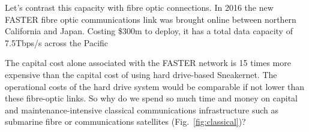 \documentclass[twocolumn, aps, rmp, amsmath, amssymb, nofootinbib, superscriptaddress, longbibliography, floatfix, table-of-contents, eqsecnum]{revtex4-2}
\begin{document}
Let's contrast this capacity with fibre optic connections. In 2016 the new FASTER fibre optic communications link was brought online between northern California and Japan. Costing \$300m to deploy, it has a total data capacity of 7.5Tbps/s across the Pacific %

The capital cost alone associated with the FASTER network is 15 times more expensive than the capital cost of using hard drive-based Sneakernet. The operational costs of the hard drive system would be comparable if not lower than these fibre-optic links. So why do we spend so much time and money on capital and maintenance-intensive classical communications infrastructure such as submarine fibre or communications satellites (Fig.~\ref{fig:classical})?
\end{document}
